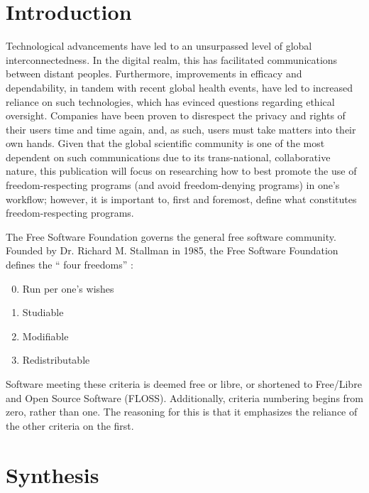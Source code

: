 \documentclass[conference]{IEEEtran}
\begin{document}
\section{Introduction}

Technological advancements have led to an unsurpassed level of global interconnectedness. In the digital realm, this has facilitated communications between distant peoples. Furthermore, improvements in efficacy and dependability, in tandem with recent global health events, have led to increased reliance on such technologies, which has evinced questions regarding ethical oversight. Companies have been proven to disrespect the privacy and rights of their users time and time again, and, as such, users must take matters into their own hands. Given that the global scientific community is one of the most dependent on such communications due to its trans-national, collaborative nature, this publication will focus on researching how to best promote the use of freedom-respecting programs (and avoid freedom-denying programs) in one's workflow; however, it is important to, first and foremost, define what constitutes freedom-respecting programs.

The Free Software Foundation governs the general free software community. Founded by Dr. Richard M. Stallman in 1985, the Free Software Foundation defines the `` four freedoms'' \cite{DefineFree}: 

\begin{enumerate}

    \setcounter{enumi}{-1}

  \item Run per one's wishes

  \item Studiable

  \item Modifiable

  \item Redistributable

\end{enumerate}

Software meeting these criteria is deemed free or libre, or shortened to Free/Libre and Open Source Software (FLOSS). Additionally, criteria numbering begins from zero, rather than one. The reasoning for this is that it emphasizes the reliance of the other criteria on the first.

\section{Synthesis}
\end{document}
